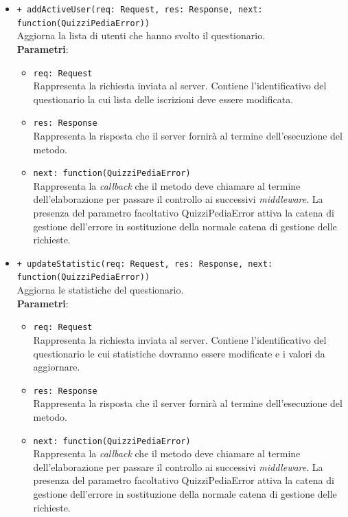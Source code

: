 \begin{itemize}
\begin{itemize}
		\item \texttt{+ addActiveUser(req: Request, res: Response, next: function(QuizziPediaError))}\\
		Aggiorna la lista di utenti che hanno svolto il questionario.\\
		\textbf{Parametri}:
		\begin{itemize}
			\item \texttt{req: Request}\\
			Rappresenta la richiesta inviata al server. Contiene l'identificativo del questionario la cui lista delle iscrizioni deve essere modificata.
			\item \texttt{res: Response}\\
			Rappresenta la risposta che il server fornirà al termine dell'esecuzione del metodo.
			\item \texttt{next: function(QuizziPediaError)}\\
			Rappresenta la \textit{callback} che il metodo deve chiamare al termine dell'elaborazione per passare il controllo ai successivi \textit{middleware}. La presenza del parametro facoltativo QuizziPediaError attiva la catena di gestione dell'errore in sostituzione della normale catena di gestione delle richieste.
		\end{itemize}
		
		\item \texttt{+ updateStatistic(req: Request, res: Response, next: function(QuizziPediaError))}\\
		Aggiorna le statistiche del questionario.\\
		\textbf{Parametri}:
		\begin{itemize}
			\item \texttt{req: Request}\\
			Rappresenta la richiesta inviata al server. Contiene l'identificativo del questionario le cui statistiche dovranno essere modificate e i valori da aggiornare.
			\item \texttt{res: Response}\\
			Rappresenta la risposta che il server fornirà al termine dell'esecuzione del metodo.
			\item \texttt{next: function(QuizziPediaError)}\\
			Rappresenta la \textit{callback} che il metodo deve chiamare al termine dell'elaborazione per passare il controllo ai successivi \textit{middleware}. La presenza del parametro facoltativo QuizziPediaError attiva la catena di gestione dell'errore in sostituzione della normale catena di gestione delle richieste.
		\end{itemize}
		

\end{itemize}
\end{itemize}
